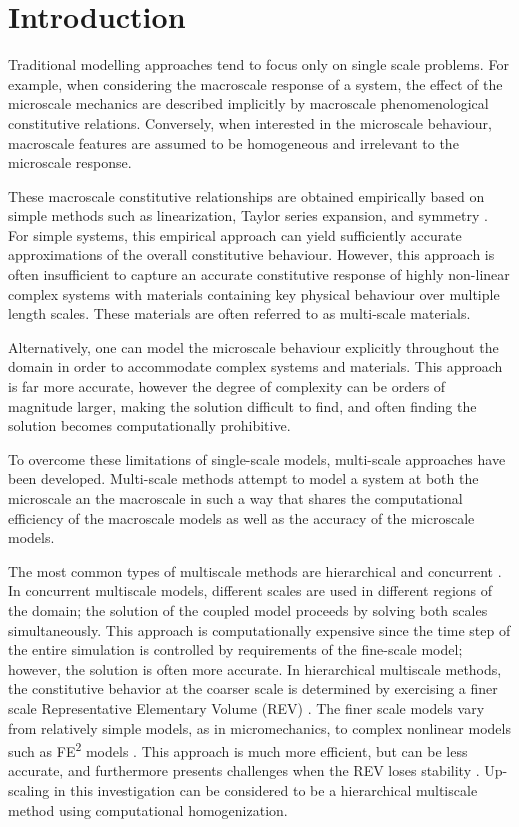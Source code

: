 \chapter{Introduction}
Traditional modelling approaches tend to focus only on single scale problems. For example, when considering the macroscale response of a system, the effect of the microscale mechanics are described implicitly by macroscale phenomenological constitutive relations. Conversely, when interested in the microscale behaviour, macroscale features are assumed to be homogeneous and irrelevant to the microscale response. 

These macroscale constitutive relationships are obtained empirically based on simple methods such as linearization, Taylor series expansion, and symmetry \citep{weinan_principles_2011}. For simple systems, this empirical approach can yield sufficiently accurate approximations of the overall constitutive behaviour. However, this approach is often insufficient to capture an accurate constitutive response of highly non-linear complex systems with materials containing key physical behaviour over multiple length scales. These materials are often referred to as multi-scale materials. 

Alternatively, one can model the microscale behaviour explicitly throughout the domain in order to accommodate complex systems and materials. This approach is far more accurate, however the degree of complexity can be orders of magnitude larger, making the solution difficult to find, and often finding the solution becomes computationally prohibitive. 

To overcome these limitations of single-scale models, multi-scale approaches have been developed. Multi-scale methods attempt to model a system at both the microscale an the macroscale in such a way that shares the computational efficiency of the macroscale models as well as the accuracy of the microscale models.

The most common types of multiscale methods are hierarchical and concurrent \citep{Gracie_2011}. In concurrent multiscale models, different scales are used in different regions of the domain; the solution of the coupled model proceeds by solving both scales simultaneously. This approach is computationally expensive since the time step of the entire simulation is controlled by requirements of the fine-scale model; however, the solution is often more accurate.  In hierarchical multiscale methods, the constitutive behavior at the coarser scale is determined by exercising a finer scale Representative Elementary Volume (REV) \citep{Li_2014}. The finer scale models vary from relatively simple models, as in micromechanics, to complex nonlinear models such as FE\textsuperscript{2} models \citep{Feyel_2003}. This approach is much more efficient, but can be less accurate, and furthermore  presents challenges when the REV loses stability \citep{Belytschko_2008}. Up-scaling in this investigation can be considered to be a hierarchical multiscale method using computational homogenization. 

